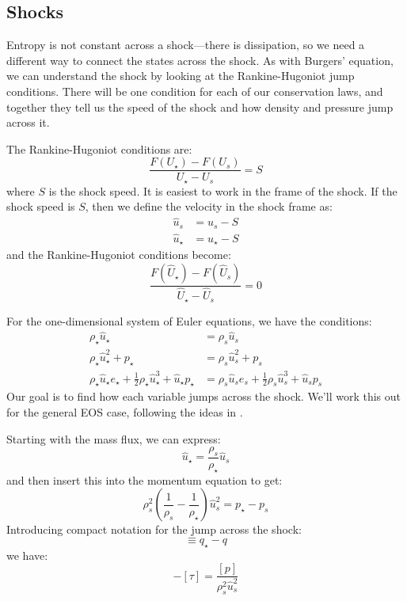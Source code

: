 \subsection{Shocks}

Entropy is not constant across a shock---there is dissipation, so we
need a different way to connect the states across the shock.  As with
Burgers' equation, we can understand the shock by looking at the
Rankine-Hugoniot jump conditions.  There will be one condition for
each of our conservation laws, and together they tell us the speed of
the shock and how density and pressure jump across
it.  

The Rankine-Hugoniot conditions are:
\begin{equation}
\frac{F(U_\star) - F(U_s)}{U_\star - U_s} = S
\end{equation}
where $S$ is the shock speed.  It is easiest to work in the frame of the shock.  If the shock speed
is $S$, then we define the velocity in the shock frame as:
\begin{align}
\hat{u}_s &= u_s - S  \\
\hat{u}_\star &= u_\star - S
\end{align}
and the Rankine-Hugoniot conditions become:
\begin{equation}
\frac{F(\hat{U}_\star) - F(\hat{U}_s)}{\hat{U}_\star - \hat{U}_s} = 0
\end{equation}

For the one-dimensional system of Euler equations, we have the conditions:
\begin{align}
\rho_\star \hat{u}_\star &= \rho_s \hat{u}_s \\
\rho_\star \hat{u}_\star^2 + p_\star &= \rho_s \hat{u}_s^2 + p_s \\
\rho_\star \hat{u}_\star e_\star + \frac{1}{2} \rho_\star \hat{u}_\star^3 + \hat{u}_\star p_\star &= 
  \rho_s \hat{u}_s e_s + \frac{1}{2} \rho_s \hat{u}_s^3 + \hat{u}_s p_s
\end{align}
Our goal is to find how each variable jumps across the shock.  We'll 
work this out for the general EOS case, following the ideas in \cite{colellaglaz:1985}.

Starting with the mass flux, we can express:
\begin{equation}
\hat{u}_\star = \frac{\rho_s}{\rho_\star} \hat{u}_s
\end{equation}
and then insert this into the momentum equation to get:
\begin{equation}
\rho_s^2 \left ( \frac{1}{\rho_s} - \frac{1}{\rho_\star} \right ) \hat{u}_s^2 = p_\star - p_s
\end{equation}
Introducing compact notation for the jump across the shock:
\begin{equation}
[q] \equiv q_\star - q
\end{equation}
we have:
\begin{equation}
-[\tau] = \frac{[p]}{\rho_s^2 \hat{u}_s^2}
\end{equation}

